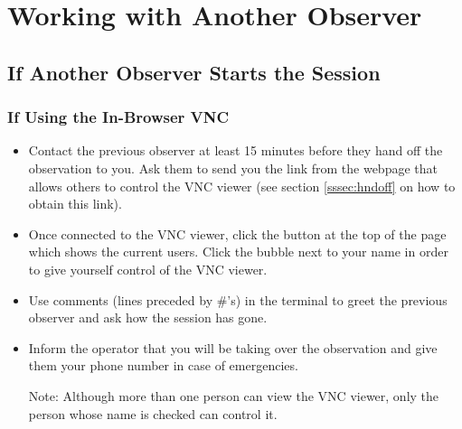 \documentclass[11pt, reqno, tbtags]{article}
\begin{document}

\section{Working with Another Observer}\label{sec:share} %

\subsection{If Another Observer Starts the Session} %

 \subsubsection{If Using the In-Browser VNC} \begin{itemize}
 \item Contact the previous observer at least 15 minutes before they hand off the observation to you. Ask them to send you the link from the webpage that allows others to control the VNC viewer (see section \ref{sssec:hndoff} on how to obtain this link).
 \item Once connected to the VNC viewer, click the button at the top of the page which shows the current users. Click the bubble next to your name in order to give yourself control of the VNC viewer. 
 \item Use comments (lines preceded by \#'s) in the terminal to greet the previous observer and ask how the session has gone.  
 \item Inform the operator that you will be taking over the observation and give them your phone number in case of emergencies.  

 Note: Although more than one person can view the VNC viewer, only the person whose name is checked can control it.
\end{itemize}
\end{document}
